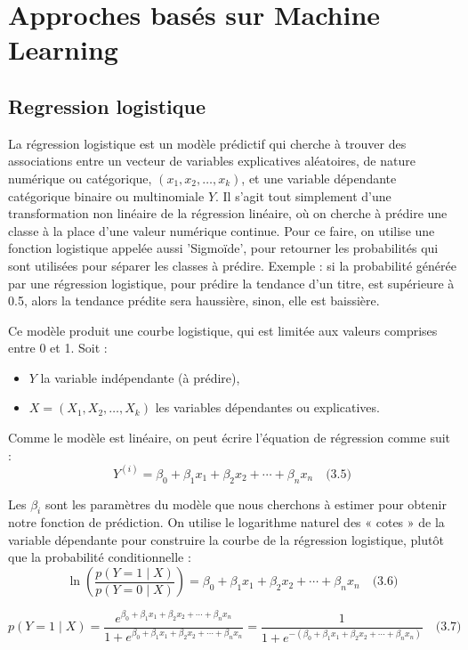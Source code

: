\section{Approches basés sur Machine Learning }

\subsection{Regression logistique}
La régression logistique est un modèle prédictif qui cherche à trouver des associations entre un
vecteur de variables explicatives aléatoires, de nature numérique ou catégorique, \( (x_1, x_2, \ldots, x_k) \),
et une variable dépendante catégorique binaire ou multinomiale \( Y \). Il s’agit tout simplement
d'une transformation non linéaire de la régression linéaire, où on cherche à prédire une classe à
la place d’une valeur numérique continue. Pour ce faire, on utilise une fonction logistique
appelée aussi 'Sigmoïde', pour retourner les probabilités qui sont utilisées pour séparer les
classes à prédire. Exemple : si la probabilité générée par une régression logistique, pour prédire
la tendance d’un titre, est supérieure à 0.5, alors la tendance prédite sera haussière, sinon, elle
est baissière.

Ce modèle produit une courbe logistique, qui est limitée aux valeurs comprises entre 0 et 1.
Soit :
\begin{itemize}
    \item \( Y \) la variable indépendante (à prédire),
    \item \( X = (X_1, X_2, \ldots, X_k) \) les variables dépendantes ou explicatives.
\end{itemize}

Comme le modèle est linéaire, on peut écrire l’équation de régression comme suit :
\[
Y^{(i)} = \beta_0 + \beta_1 x_1 + \beta_2 x_2 + \cdots + \beta_n x_n \quad \text{(3.5)}
\]

Les \( \beta_i \) sont les paramètres du modèle que nous cherchons à estimer pour obtenir notre fonction
de prédiction. On utilise le logarithme naturel des « cotes » de la variable dépendante pour
construire la courbe de la régression logistique, plutôt que la probabilité conditionnelle :
\[
\ln \left( \frac{p(Y = 1 \mid X)}{p(Y = 0 \mid X)} \right) = \beta_0 + \beta_1 x_1 + \beta_2 x_2 + \cdots + \beta_n x_n \quad \text{(3.6)}
\]

\[
p(Y = 1 \mid X) = \frac{e^{\beta_0 + \beta_1 x_1 + \beta_2 x_2 + \cdots + \beta_n x_n}}{1 + e^{\beta_0 + \beta_1 x_1 + \beta_2 x_2 + \cdots + \beta_n x_n}} = \frac{1}{1 + e^{-(\beta_0 + \beta_1 x_1 + \beta_2 x_2 + \cdots + \beta_n x_n)}} \quad \text{(3.7)}
\]


